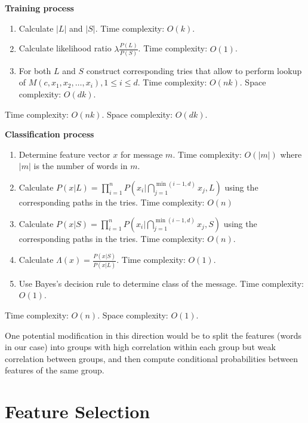\documentclass[12pt]{report}
\begin{document}
\textbf{Training process}

\begin{enumerate}
	\item Calculate $|L|$ and $|S|$. Time complexity: $O(k)$.
	\item Calculate likelihood ratio $\lambda \frac{P(L)}{P(S)}$. Time complexity: $O(1)$.
	\item For both $L$ and $S$ construct corresponding tries that allow to perform lookup of $M(c, x_1, x_2, \dots, x_i), 1 \le i \le d$. Time complexity: $O(nk)$. Space complexity: $O(dk)$.
\end{enumerate}

Time complexity: $O(nk)$. Space complexity: $O(dk)$.

\textbf{Classification process}

\begin{enumerate}
	\item Determine feature vector $x$ for message $m$. Time complexity: $O(|m|)$ where $|m|$ is the number of words in $m$.
	\item Calculate $P(x | L) = \prod_{i=1}^{n} P(x_i | \bigcap_{j = 1}^{\min(i - 1, d)} x_j, L)$ using the corresponding paths in the tries. Time complexity: $O(n)$
	\item Calculate $P(x | S) = \prod_{i=1}^{n} P(x_i | \bigcap_{j = 1}^{\min(i - 1, d)} x_j, S)$ using the corresponding paths in the tries. Time complexity: $O(n)$.
	\item Calculate $\Lambda(x) = \frac{P(x | S)}{P(x | L)}$. Time complexity: $O(1)$.
	\item Use Bayes's decision rule to determine class of the message. Time complexity: $O(1)$.
\end{enumerate}

Time complexity: $O(n)$. Space complexity: $O(1)$.

One potential modification in this direction would be to split the features (words in our case) into groups with high correlation within each group but weak correlation between groups, and then compute conditional probabilities between features of the same group.

\newpage


\chapter{Feature Selection}
\end{document}
